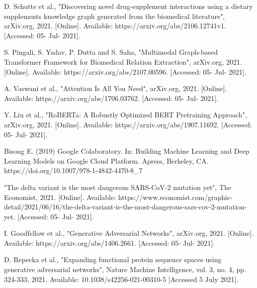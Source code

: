 \documentclass[conference,compsoc]{IEEEtran}
\begin{document}
\begin{thebibliography}{1}
D. Schutte et al., "Discovering novel drug-supplement interactions using a dietary supplements knowledge graph generated from the biomedical literature", arXiv.org, 2021. [Online]. Available: https://arxiv.org/abs/2106.12741v1. [Accessed: 05- Jul- 2021]. 

S. Pingali, S. Yadav, P. Dutta and S. Saha, "Multimodal Graph-based Transformer Framework for Biomedical Relation Extraction", arXiv.org, 2021. [Online]. Available: https://arxiv.org/abs/2107.00596. [Accessed: 05- Jul- 2021].

A. Vaswani et al., "Attention Is All You Need", arXiv.org, 2021. [Online]. Available: https://arxiv.org/abs/1706.03762. [Accessed: 05- Jul- 2021].

Y. Liu et al., "RoBERTa: A Robustly Optimized BERT Pretraining Approach", arXiv.org, 2021. [Online]. Available: https://arxiv.org/abs/1907.11692. [Accessed: 05- Jul- 2021].

Bisong E. (2019) Google Colaboratory. In: Building Machine Learning and Deep Learning Models on Google Cloud Platform. Apress, Berkeley, CA. https://doi.org/10.1007/978-1-4842-4470-8\_7

"The delta variant is the most dangerous SARS-CoV-2 mutation yet", The Economist, 2021. [Online]. Available: https://www.economist.com/graphic-detail/2021/06/16/the-delta-variant-is-the-most-dangerous-sars-cov-2-mutation-yet. [Accessed: 05- Jul- 2021].

 I. Goodfellow et al., "Generative Adversarial Networks", arXiv.org, 2021. [Online]. Available: https://arxiv.org/abs/1406.2661. [Accessed: 05- Jul- 2021].
 
D. Repecka et al., "Expanding functional protein sequence spaces using generative adversarial networks", Nature Machine Intelligence, vol. 3, no. 4, pp. 324-333, 2021. Available: 10.1038/s42256-021-00310-5 [Accessed 5 July 2021].

\end{thebibliography}




\end{document}
